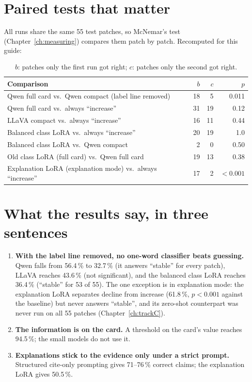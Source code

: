 \section{Paired tests that matter}

All runs share the same 55 test patches, so McNemar's test (Chapter~\ref{ch:measuring}) compares them patch by patch. Recomputed for this guide:

\begin{table}[H]
\centering
\small
\begin{tabular}{lrrr}
\toprule
Comparison & $b$ & $c$ & $p$ \\
\midrule
Qwen full card vs.\ Qwen compact (label line removed) & 18 & 5 & 0.011 \\
Qwen full card vs.\ always ``increase'' & 31 & 19 & 0.12 \\
LLaVA compact vs.\ always ``increase'' & 16 & 11 & 0.44 \\
Balanced class LoRA vs.\ always ``increase'' & 20 & 19 & 1.0 \\
Balanced class LoRA vs.\ Qwen compact & 2 & 0 & 0.50 \\
Old class LoRA (full card) vs.\ Qwen full card & 19 & 13 & 0.38 \\
Explanation LoRA (explanation mode) vs.\ always ``increase'' & 17 & 2 & $<0.001$ \\
\bottomrule
\end{tabular}
\caption{$b$: patches only the first run got right; $c$: patches only the second got right.}
\label{tab:mastermcnemar}
\end{table}

\section{What the results say, in three sentences}

\begin{plainwords}
\begin{enumerate}
  \item \textbf{With the label line removed, no one-word classifier beats guessing.} Qwen falls from 56.4\,\% to 32.7\,\% (it answers ``stable'' for every patch), LLaVA reaches 43.6\,\% (not significant), and the balanced class LoRA reaches 36.4\,\% (``stable'' for 53 of 55). The one exception is in explanation mode: the explanation LoRA separates decline from increase (61.8\,\%, $p < 0.001$ against the baseline) but never answers ``stable'', and its zero-shot counterpart was never run on all 55 patches (Chapter~\ref{ch:trackC}).
  \item \textbf{The information is on the card.} A threshold on the card's \dndvi{} value reaches 94.5\,\%; the small models do not use it.
  \item \textbf{Explanations stick to the evidence only under a strict prompt.} Structured cite-only prompting gives 71--76\,\% correct claims; the explanation LoRA gives 50.5\,\%.
\end{enumerate}
\end{plainwords}

